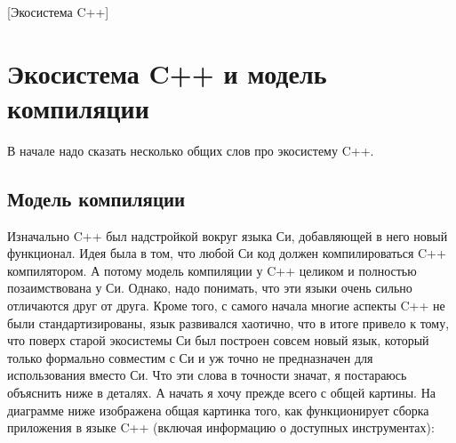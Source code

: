 [Экосистема C++]


\section{Экосистема C++ и модель компиляции}

В начале надо сказать несколько общих слов про экосистему C++.

\subsection{Модель компиляции}

Изначально C++ был надстройкой вокруг языка Си, добавляющей в него новый функционал.
Идея была в том, что любой Си код должен компилироваться C++ компилятором.
А потому модель компиляции у C++ целиком и полностью позаимствована у Си.
Однако, надо понимать, что эти языки очень сильно отличаются друг от друга.
Кроме того, с самого начала многие аспекты C++ не были стандартизированы, язык развивался хаотично, что в итоге привело к тому, что поверх старой экосистемы Си был построен совсем новый язык, который только формально совместим с Си и уж точно не предназначен для использования вместо Си.
Что эти слова в точности значат, я постараюсь объяснить ниже в деталях.
А начать я хочу прежде всего с общей картины.
На диаграмме ниже изображена общая картинка того, как функционирует сборка приложения в языке C++ (включая информацию о доступных инструментах):
